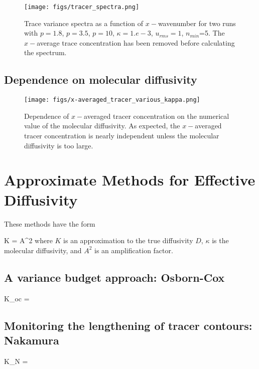 \documentclass[11pt]{article}
\begin{document}
\begin{figure}[ht]
    \label{p35}
    \centering
    \texttt{[image: figs/tracer\_spectra.png]}
    \caption{Trace variance spectra as a function of $x-$wavenumber for two runs 
             with $p=1.8$, $p = 3.5$, $p=10$, $\kappa=1.e-3$, $u_{rms}=1$, $n_{min}$=5. The $x-$average
            trace concentration has been removed before calculating the spectrum.}
\end{figure}


\subsection{Dependence on molecular diffusivity}

\begin{figure}[ht]
    \label{p35}
    \centering
    \texttt{[image: figs/x-averaged\_tracer\_various\_kappa.png]}
    \caption{Dependence of $x-$averaged tracer concentration on the numerical value of the molecular diffusivity.
            As expected, the  $x-$averaged tracer concentration is nearly independent unless the molecular
            diffusivity is too large.}
\end{figure}


  

\section{Approximate Methods for Effective Diffusivity}
These methods have the form

\beq
K = A^2 \kappa\com
\eeq
where $K$ is an approximation to the true diffusivity $D$, $\kappa$ is the molecular diffusivity, and $A^2$ is an amplification factor.

\subsection{A variance budget approach: Osborn-Cox}
\beq
\label{koc}
K_{oc} = \kappa\per
\eeq
\subsection{Monitoring the lengthening of tracer contours: Nakamura}
\beq
\label{kN}
K_{N} = \kappa\per
\eeq
\end{document}
